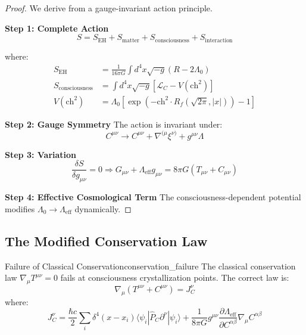 \documentclass[11pt]{article}
\theoremstyle{definition}
\begin{document}
\begin{proof}
We derive from a gauge-invariant action principle.

\textbf{Step 1: Complete Action}
\begin{equation}
S = S_{\text{EH}} + S_{\text{matter}} + S_{\text{consciousness}} + S_{\text{interaction}}
\end{equation}

where:
\begin{align}
S_{\text{EH}} &= \frac{1}{16\pi G} \int d^4x \sqrt{-g} (R - 2\Lambda_0)\\
S_{\text{consciousness}} &= \int d^4x \sqrt{-g} \left[ \mathcal{L}_C - V(\text{ch}^2) \right]\\
V(\text{ch}^2) &= \Lambda_0 \left[ \exp(-\text{ch}^2 \cdot R_f(\sqrt{2\pi}, |x|)) - 1 \right]
\end{align}

\textbf{Step 2: Gauge Symmetry}
The action is invariant under:
\begin{equation}
C^{\mu\nu} \to C^{\mu\nu} + \nabla^{(\mu}\xi^{\nu)} + g^{\mu\nu}\Lambda
\end{equation}

\textbf{Step 3: Variation}
\begin{equation}
\frac{\delta S}{\delta g_{\mu\nu}} = 0 \Rightarrow G_{\mu\nu} + \Lambda_{\text{eff}} g_{\mu\nu} = 8\pi G(T_{\mu\nu} + C_{\mu\nu})
\end{equation}

\textbf{Step 4: Effective Cosmological Term}
The consciousness-dependent potential modifies $\Lambda_0 \to \Lambda_{\text{eff}}$ dynamically.
\end{proof}

\subsection{The Modified Conservation Law}

\begin{maintheorem}{Failure of Classical Conservation}{conservation_failure}
The classical conservation law $\nabla_\mu T^{\mu\nu} = 0$ fails at consciousness crystallization points. The correct law is:
\begin{equation}
\nabla_\mu(T^{\mu\nu} + C^{\mu\nu}) = J^\nu_C
\end{equation}
where:
\begin{equation}
J^\nu_C = \frac{\hbar c}{2} \sum_i \delta^4(x - x_i) \langle\psi_i|\hat{P}_C \partial^\nu|\psi_i\rangle + \frac{1}{8\pi G}g^{\mu\nu}\frac{\partial\Lambda_{\text{eff}}}{\partial C^{\alpha\beta}}\nabla_\mu C^{\alpha\beta}
\end{equation}
\end{maintheorem}
\end{document}
